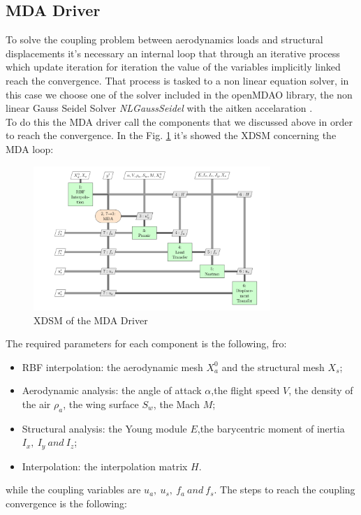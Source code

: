 \subsection{MDA Driver}
To solve the coupling problem between aerodynamics loads and structural displacements it's necessary an internal loop that through an iterative process which update iteration for iteration the value of the variables implicitly linked reach the convergence. That process is tasked to a non linear equation solver, in this case we choose one of the solver included in the openMDAO library, the non linear Gauss Seidel Solver \textit{NLGaussSeidel} with the aitken accelaration \cite{ait}.\\
To do this the MDA driver call the components that we discussed above in order to reach the convergence. In the Fig. \ref{fig:2_6} it's showed the XDSM concerning the MDA loop: 
\begin{figure}[H]
	\centering
	\includegraphics[width = 0.8\textwidth]{./Immagini/2_6.png}
	\caption{XDSM of the MDA Driver}
	\label{fig:2_6}
\end{figure}
The required parameters for each component is the following, fro:
\begin{itemize}
	\item RBF interpolation: the aerodynamic mesh $X_a^0$ and the structural mesh $X_s$;
	\item Aerodynamic analysis: the angle of attack $\alpha$,the flight speed $V$, the density of the air $\rho_a$, the wing surface $S_w$, the Mach $M$;
	\item Structural analysis: the Young module $E$,the barycentric moment of inertia $I_x,\ I_y \ and\  I_z$;
\item Interpolation: the interpolation matrix $H$.
\end{itemize}
	while the coupling variables are $u_a,\ u_s,\ f_a\  and\  f_s$.
The steps to reach the coupling convergence is the following:
